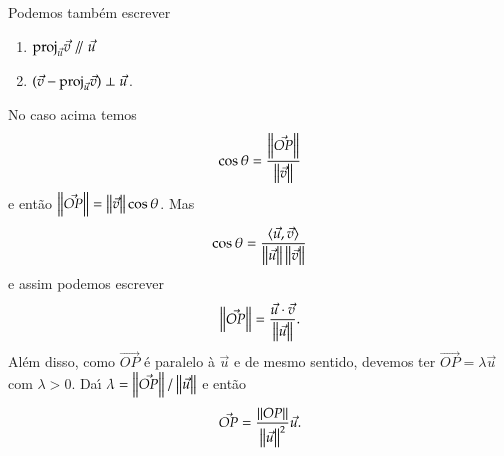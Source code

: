 Podemos tamb\'em escrever
\begin{enumerate}
  \item $\proj_{\vec{u}}\vec{v} \varparallel\vec{u}$
    \item $(\vec{v} - {\rm proj}_{\vec{u}}\vec{v}) \perp \vec{u}$.
\end{enumerate}

No caso acima temos
\[
  \cos\theta = \dfrac{\left\Vert{\vec{OP}}\right\Vert}{\left\Vert{\vec{v}}\right\Vert}
\]
e ent\~ao $\left\Vert{\vec{OP}}\right\Vert = \left\Vert{\vec{v}}\right\Vert\cos\theta$. Mas
\[
  \cos\theta = \dfrac{\langle \vec{u}, \vec{v} \rangle}{\left\Vert{\vec{u}}\right\Vert\left\Vert{\vec{v}}\right\Vert}
\]
e assim podemos escrever
\[
  \left\Vert{\vec{OP}}\right\Vert = \dfrac{\vec{u}\cdot\vec{v}}{\left\Vert{\vec{u}}\right\Vert}.
\]
Al\'em disso, como $\vec{OP}$ \'e paralelo \`a $\vec{u}$ e de mesmo sentido, devemos ter $\vec{OP} = \lambda\vec{u}$ com $\lambda > 0$. Da{\'\i}
$\lambda = \left\Vert{\vec{OP}}\right\Vert/\left\Vert{\vec{u}}\right\Vert$ e ent\~ao
\[
  \vec{OP} = \dfrac{\left\Vert{OP}\right\Vert}{\left\Vert{\vec{u}}\right\Vert^2}\vec{u}.
\]

